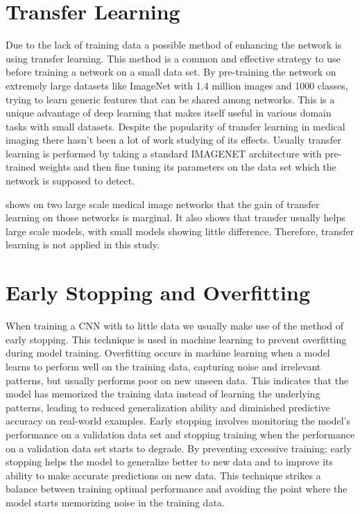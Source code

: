 \documentclass[
a4paper, 
12pt,
grayscalebody, %
abstract=on,
twoside, BCOR10mm, 12pt, DIV13,headinclude, footexclude, final, abstracton, openright
]{ibireprt}
\numberwithin{equation}{chapter}
\numberwithin{table}{chapter}
\numberwithin{figure}{chapter}
\numberwithin{algorithm}{chapter}
\numberwithin{example}{chapter}
\numberwithin{example}{chapter}
\begin{document}
\section{Transfer Learning}
Due to the lack of training data a possible method of enhancing the network is using transfer learning. This method is a common and effective strategy to use before training a network on a small data set. By pre-training the network on extremely large datasets like ImageNet with 1.4 million images and 1000 classes, trying to learn generic features that can be shared among networks. \cite{Yamashita2018} This is a unique advantage of deep learning that makes itself useful in various domain tasks with small datasets. Despite the popularity of transfer learning in medical imaging there hasn't been a lot of work studying of its effects. Usually transfer learning is performed by taking a standard IMAGENET architecture with pre-trained weights and then fine tuning its parameters on the data set which the network is supposed to detect.


\cite{Raghu2019} shows on two large scale medical image networks that the gain of transfer learning on those networks is marginal. It also shows that transfer usually helps large scale models, with small models showing little difference. Therefore, transfer learning is not applied in this study.

\section{Early Stopping and Overfitting}
When training a CNN with to little data we usually make use of the method of early stopping. This technique is used in machine learning to prevent overfitting during model training. Overfitting occurs in machine learning when a model learns to perform well on the training data, capturing noise and irrelevant patterns, but usually performs poor on new unseen data. This indicates that the model has memorized the training data instead of learning the underlying patterns, leading to reduced generalization ability and diminished predictive accuracy on real-world examples. Early stopping involves monitoring the model's performance on a validation data set and stopping training when the performance on a validation data set starts to degrade. By preventing excessive training; early stopping helps the model to generalize better to new data and to improve its ability to make accurate predictions on new data.
This technique strikes a balance between training optimal performance and avoiding the point where the model starts memorizing noise in the training data. %
\end{document}
